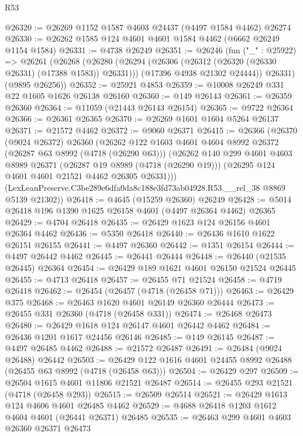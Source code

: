 \begin{lexlean}{R53}
\begin{coremodule}
@26320 := @26269 @1152 @1587 @4603 @24437 (@4497 @1584 @4462) @26274
@26330 := @26262 @1585 @124 @4601 @4601 @1584 @4462 (@6662 @26249 @1154 @1584)
@26331 := @4738 @26249
@26351 := @26246
    (fun ("_" : @25922) =>
    @26261
      (@26268
        (@26280
          (@26294 (@26306 (@26312 (@26320 (@26330 @26331) (@17388 @1583)) @26331)))
          (@17396 @4938 @21302 @24444))
        @26331)
      (@9895 @26256))
@26352 := @25921 @4853
@26359 := @10008 @26249 @331 @22 @1605 @1626 @26138 @26160
@26360 := @149 @26143
@26361 := @26359 @26360
@26364 := @11059 (@21443 @26143 @26154)
@26365 := @9722 @26364
@26366 := @26361 @26365
@26370 := @26269 @1601 @1604 @5264 @26137
@26371 := @21572 @4462
@26372 := @9060 @26371
@26415 := @26366
    (@26370
      (@9024 @26372)
      @26360
      (@26262
        @122
        @1603
        @4601
        @4604
        @8992
        @26372
        (@26287 @63 @8992 (@4718 (@26290 @63)))
        (@26262
          @140
          @299
          @4601
          @4603
          @8989
          @26371
          (@26287 @19 @8989 (@4718 (@26290 @19)))
          (@26295 @124 @4601 @4601 @21521 @4462 @26305 @26331)))
      (LexLeanPreserve.C3be289e6dfa0da8c188e3fd73ab04928.R53.__rel_38 @8869 @5139 @21302))
@26418 := @4645 (@15259 @26360) @26249
@26428 := @5014 @26418 @196 @1390 @1625 @26158 @4601 (@4497 @26364 @4462) @26365
@26429 := @4704 @26418
@26435 := @26429 @1623 @124 @26156 @4601 @26364 @4462
@26436 := @5350 @26418
@26440 := @26436 @1610 @1622 @26151 @26155
@26441 := @4497 @26360
@26442 := @1351 @26154
@26444 := @4497 @26442 @4462
@26445 := @26441 @26444
@26448 := @26440 (@21535 @26445) @26364
@26454 := @26429 @189 @1621 @4601 @26150 @21524 @26445
@26455 := @4713 @26418
@26457 := @26455 @71 @21524
@26458 := @4719 @26418
@26462 := @26454 (@26457 (@4718 (@26458 @71)))
@26463 := @26429 @375
@26468 := @26463 @1620 @4601 @26149 @26360 @26444
@26473 := @26455 @331 @26360 (@4718 (@26458 @331))
@26474 := @26468 @26473
@26480 := @26429 @1618 @124 @26147 @4601 @26442 @4462
@26484 := @26436 @1201 @1617 @24456 @26146
@26485 := @149 @26145
@26487 := @4497 @26485 @4462
@26488 := @21572 @26487
@26491 := @26484 (@9024 @26488) @26442
@26503 := @26429 @122 @1616 @4601 @24455 @8992 @26488 (@26455 @63 @8992 (@4718 (@26458 @63)))
@26504 := @26429 @297
@26509 := @26504 @1615 @4601 @11806 @21521 @26487
@26514 := @26455 @293 @21521 (@4718 (@26458 @293))
@26515 := @26509 @26514
@26521 := @26429 @1613 @124 @4606 @4601 @26485 @4462
@26529 := @4688 @26418 @1203 @1612 @4604 @4601 (@26441 @26371) @26485
@26535 := @26463 @299 @4601 @4603 @26360 @26371 @26473

\end{coremodule}
\end{lexlean}
